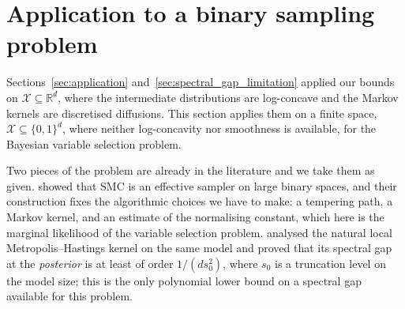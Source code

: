 \documentclass[aos]{imsart}%
\newcommand{\ambientspace}[0]{\mathcal{X}}
\newcommand{\bbR}[0]{\mathbb{R}}
\theoremstyle{plain}
\theoremstyle{definition}
\begin{document}
    \providecommand{\Ltil}{\widetilde{L}}
    \providecommand{\Proj}{\mathrm{P}}          %
    \providecommand{\Prec}{\mathrm{Prec}}       %
    \providecommand{\Gap}{\mathrm{Gap}}         %
    \providecommand{\RE}{\mathrm{RE}}
    \providecommand{\IC}{\mathrm{IC}}
    \providecommand{\Dir}{\mathcal{E}}          %
    \providecommand{\Energy}{\mathsf{E}}        %
    \providecommand{\Spread}{\Delta_{\mathrm{int}}} %
    \providecommand{\Good}{\mathcal{H}_n}       %
    \providecommand{\Cong}{\varrho}             %
    \providecommand{\Len}{\ell}                 %


    \section{Application to a binary sampling problem}
    \label{sec:binary}

    Sections~\ref{sec:application} and~\ref{sec:spectral_gap_limitation} applied
    our bounds on $\ambientspace\subseteq\bbR^{d}$, where the intermediate
    distributions are log-concave and the Markov kernels are discretised
    diffusions. This section applies them on a finite space,
    $\ambientspace\subseteq\{0,1\}^{d}$, where neither log-concavity nor
    smoothness is available, for the Bayesian variable selection problem.

    Two pieces of the problem are already in the literature and we take them as
    given. \citet{Schafer2013-yq} showed that SMC is an effective sampler on
    large binary spaces, and their construction fixes the algorithmic choices we
    have to make: a tempering path, a Markov kernel, and an estimate of the
    normalising constant, which here is the marginal likelihood of the variable
    selection problem. \citet{YangWainwrightJordan2016} analysed the natural
    local Metropolis--Hastings kernel on the same model and proved that its
    spectral gap at the \emph{posterior} is at least of order $1/(ds_0^{2})$,
    where $s_0$ is a truncation level on the model size; this is the only
    polynomial lower bound on a spectral gap available for this problem.
\end{document}
